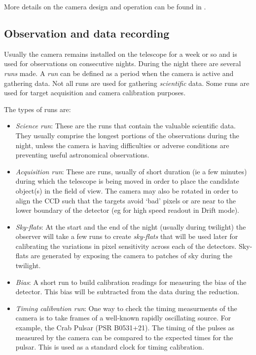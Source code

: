 More details on the camera design and operation can be found in \cite{dhillon07}.

\subsection{Observation and data recording}

Usually the camera remains installed on the telescope for a week or so and is used for observations on consecutive nights. During the night there are several \emph{runs} made. A \emph{run} can be defined as a period when the camera is active and gathering data. Not all runs are used for gathering \emph{scientific} data. Some runs are used for target acquisition and camera calibration purposes. 

The types of runs are: 
\begin{itemize}
	\item \emph{Science run}: These are the runs that contain the valuable scientific data. They usually comprise the longest portions of the observations during the night, unless the camera is having difficulties or adverse conditions are preventing useful astronomical observations.
	\item \emph{Acquisition run}: These are runs, usually of short duration (ie a few minutes) during which the telescope is being moved in order to place the candidate object(s) in the field of view. The camera may also be rotated in order to align the CCD such that the targets avoid `bad' pixels or are near to the lower boundary of the detector (eg for high speed readout in Drift mode). 
	\item \emph{Sky-flats}: At the start and the end of the night (usually during twilight) the observer will take a few runs to create \emph{sky-flats} that will be used later for calibrating the variations in pixel sensitivity across each of the detectors.  Sky-flats are generated by exposing the camera to patches of sky during the twilight. 
	\item \emph{Bias}: A short run to build calibration readings for measuring the bias of the detector. This bias will be subtracted from the data during the reduction. 
	\item \emph{Timing calibration run}: One way to check the timing measurments of the camera is to take frames of a well-known rapidly oscillating source. For example, the Crab Pulsar (PSR B0531+21). The timing of the pulses as measured by the camera can be compared to the expected times for the pulsar. This is used as a standard clock for timing calibration.
\end{itemize}

